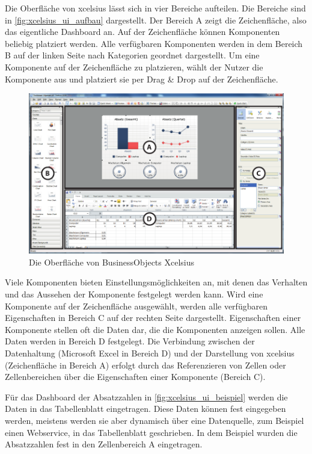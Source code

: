 \begin{onehalfspacing}
Die Oberfläche von \gls{xcelsius} lässt sich in vier Bereiche aufteilen. Die Bereiche sind in \vref{fig:xcelsius_ui_aufbau} dargestellt. Der Bereich A zeigt die Zeichenfläche, also das eigentliche Dashboard an. Auf der Zeichenfläche können Komponenten beliebig platziert werden. Alle verfügbaren Komponenten werden in dem Bereich B auf der linken Seite nach Kategorien geordnet dargestellt. Um eine Komponente auf der Zeichenfläche zu platzieren, wählt der Nutzer die Komponente aus und platziert sie per Drag \& Drop auf der Zeichenfläche. 

\begin{figure}[ht]
\centering
\setlength{\unitlength}{1mm}
\includegraphics[width=15cm]{images/Abbildung5-Xcelsius-Oberflaeche-AI.pdf}
\caption{Die Oberfläche von BusinessObjects Xcelsius\label{fig:xcelsius_ui_aufbau}}
\end{figure}

Viele Komponenten bieten Einstellungsmöglichkeiten an, mit denen das Verhalten und das Aussehen der Komponente festgelegt werden kann. Wird eine Komponente auf der Zeichenfläche ausgewählt, werden alle verfügbaren Eigenschaften in Bereich C auf der rechten Seite dargestellt. Eigenschaften einer Komponente stellen oft die Daten dar, die die Komponenten anzeigen sollen. Alle Daten werden in Bereich D festgelegt. Die Verbindung zwischen der Datenhaltung (Microsoft Excel in Bereich D) und der Darstellung von \gls{xcelsius} (Zeichenfläche in Bereich A) erfolgt durch das Referenzieren von Zellen oder Zellenbereichen über die Eigenschaften einer Komponente (Bereich C).

Für das Dashboard der Absatzzahlen in \vref{fig:xcelsius_ui_beispiel} werden die Daten in das Tabellenblatt eingetragen. Diese Daten können fest eingegeben werden, meistens werden sie aber dynamisch über eine Datenquelle, zum Beispiel einen Webservice, in das Tabellenblatt geschrieben. In dem Beispiel wurden die Absatzzahlen fest in den Zellenbereich A eingetragen. 


\end{onehalfspacing}

